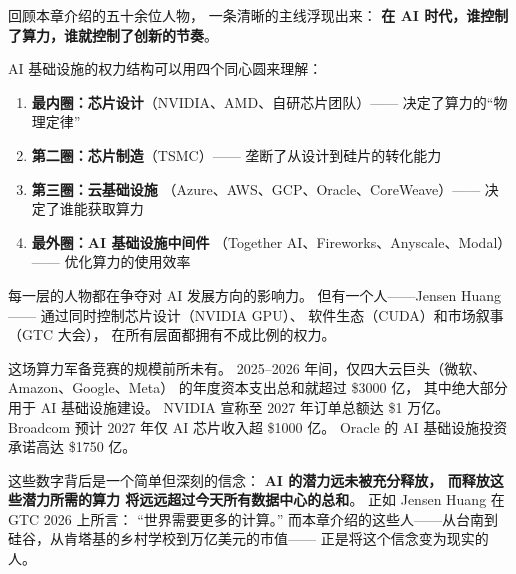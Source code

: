 回顾本章介绍的五十余位人物，
一条清晰的主线浮现出来：
\textbf{在 AI 时代，谁控制了算力，谁就控制了创新的节奏}。

\begin{whybox}[算力权力的四层结构]
AI 基础设施的权力结构可以用四个同心圆来理解：
\begin{enumerate}[noitemsep]
  \item \textbf{最内圈：芯片设计}（NVIDIA、AMD、自研芯片团队）——
        决定了算力的``物理定律''
  \item \textbf{第二圈：芯片制造}（TSMC）——
        垄断了从设计到硅片的转化能力
  \item \textbf{第三圈：云基础设施}
        （Azure、AWS、GCP、Oracle、CoreWeave）——
        决定了谁能获取算力
  \item \textbf{最外圈：AI 基础设施中间件}
        （Together AI、Fireworks、Anyscale、Modal）——
        优化算力的使用效率
\end{enumerate}
每一层的人物都在争夺对 AI 发展方向的影响力。
但有一个人——Jensen Huang——
通过同时控制芯片设计（NVIDIA GPU）、
软件生态（CUDA）和市场叙事（GTC 大会），
在所有层面都拥有不成比例的权力。
\end{whybox}

这场算力军备竞赛的规模前所未有。
2025--2026 年间，仅四大云巨头（微软、Amazon、Google、Meta）
的年度资本支出总和就超过 \$3000 亿，
其中绝大部分用于 AI 基础设施建设。
NVIDIA 宣称至 2027 年订单总额达 \$1 万亿。
Broadcom 预计 2027 年仅 AI 芯片收入超 \$1000 亿。
Oracle 的 AI 基础设施投资承诺高达 \$1750 亿。

这些数字背后是一个简单但深刻的信念：
\textbf{AI 的潜力远未被充分释放，
而释放这些潜力所需的算力
将远远超过今天所有数据中心的总和}。
正如 Jensen Huang 在 GTC 2026 上所言：
``世界需要更多的计算。''
而本章介绍的这些人——从台南到硅谷，从肯塔基的乡村学校到万亿美元的市值——
正是将这个信念变为现实的人。

